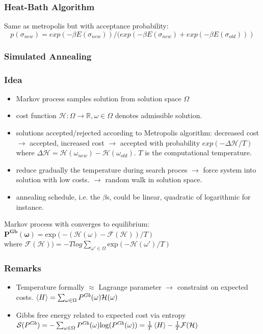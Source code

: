 \documentclass[9pt,parskip]{scrartcl}
\begin{document}
\begin{multicols*}{4}
\begin{center}
\end{center}

\subsubsection*{Heat-Bath Algorithm}
Same as metropolis but with acceptance probability:
$$p(\sigma_{new}) = exp(-\beta E(\sigma_{new})) / ( exp(-\beta E(\sigma_{new}) + exp(-\beta E(\sigma_{old})))$$

\subsubsection*{Simulated Annealing}
\subsubsection*{Idea}
\begin{itemize}
	\item Markov process samples solution from solution space $\Omega$
	\item cost function $\mathcal{H}: \Omega \to \mathbb{R}, \omega \in \Omega$ denotes admissible solution.
	\item solutions accepted/rejected according to Metropolis algorithm: decreased cost $\to$ accepted, increased cost $\to$ accepted with probability $exp(- \Delta \mathcal{H}/T)$ where $\Delta \mathcal{H} = \mathcal{H}(\omega_{new}) - \mathcal{H}(\omega_{old}) $. $T$ is the computational temperature.
	\item reduce gradually the temperature during search proces $\to$ force system into solution with low costs. $\to$ random walk in solution space.
	\item annealing schedule, i.e. the $\beta$s, could be linear, quadratic of logarithmic for instance.

\end{itemize}
Markov process with converges to equilibrium: \\
$\mathbf{P^{Gb}(\omega)} = \text{exp}(-(\mathcal{H}(\omega) - \mathcal{F}(\mathcal{H}))/T )$ \\
where $\mathcal{F}(\mathcal{H})) = -T log \sum_{\omega' \in \Omega} \text{exp}(-\mathcal{H}(\omega')/T )$
\subsubsection*{Remarks}
\begin{itemize}
	\item Temperature formally $\approx$ Lagrange parameter $\to$ constraint on expected costs. $\braket{H} = \sum_{\omega \in \Omega} P^{Gb}(\omega)  \mathcal{H}(\omega)$
	\item Gibbs free energy related to expected cost via entropy $\mathcal{S}(P^{Gb}) = -\sum_{\omega \in \Omega} P^{Gb}(\omega)  \text{log} (P^{Gb}(\omega) ) = \frac 1 T \braket{H} - \frac 1 T \mathcal{F}(\mathcal{H})$
\end{itemize}


\end{multicols*}
\end{document}
